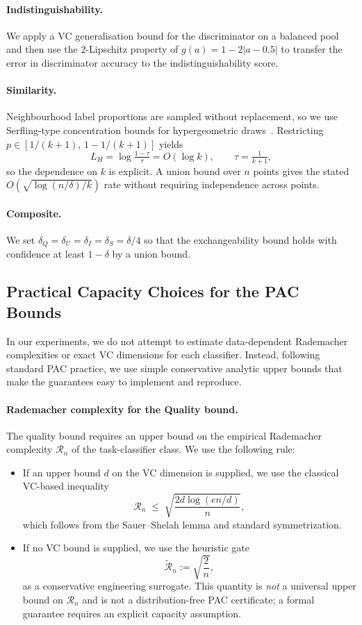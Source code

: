 \paragraph{Indistinguishability.}
We apply a VC generalisation bound for the discriminator on a balanced pool and then use the $2$-Lipschitz property of $g(a)=1-2|a-0.5|$ to transfer the error in discriminator accuracy to the indistinguishability score.

\paragraph{Similarity.}
Neighbourhood label proportions are sampled without replacement, so we use Serfling-type concentration bounds for hypergeometric draws~\citep{serfling1974}. Restricting $p\in[1/(k+1),\,1-1/(k+1)]$ yields
\[
L_H=\log\!\tfrac{1-\tau}{\tau}=O(\log k),
\qquad \tau=\tfrac1{k+1},
\]
so the dependence on $k$ is explicit. A union bound over $n$ points gives the stated
$O(\sqrt{\log(n/\delta)/k})$ rate without requiring independence across points.

\paragraph{Composite.}
We set $\delta_Q=\delta_U=\delta_I=\delta_S=\delta/4$ so that the exchangeability bound holds with confidence at least $1-\delta$ by a union bound.

\subsection{Practical Capacity Choices for the PAC Bounds}
\label{app:bound-implementation}

In our experiments, we do not attempt to estimate data-dependent Rademacher complexities or exact VC dimensions for each classifier. Instead, following standard PAC practice, we use simple conservative analytic upper bounds that make the guarantees easy to implement and reproduce.

\paragraph{Rademacher complexity for the Quality bound.}
The quality bound requires an upper bound on the empirical Rademacher complexity $\mathcal{R}_n$ of the task-classifier class. We use the following rule:
\begin{itemize}
    \item If an upper bound $d$ on the VC dimension is supplied, we use the classical VC-based inequality
    \[
      \mathcal{R}_n \;\le\;
      \sqrt{\frac{2 d \log(e n / d)}{n}},
    \]
    which follows from the Sauer--Shelah lemma and standard symmetrization.
    \item If no VC bound is supplied, we use the heuristic gate
    \[
      \widetilde{\mathcal{R}}_n := \sqrt{\frac{2}{n}},
    \]
    as a conservative engineering surrogate. This quantity is \emph{not} a universal upper bound on $\mathcal R_n$ and is not a distribution-free PAC certificate; a formal guarantee requires an explicit capacity assumption.
\end{itemize}

